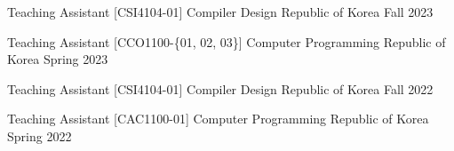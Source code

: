 

\begin{cventries}

  \cventry
    {Teaching Assistant} %
    {[CSI4104-01] Compiler Design} %
    {Republic of Korea} %
    {Fall 2023} %
    {}

  \cventry
    {Teaching Assistant} %
    {[CCO1100-\{01, 02, 03\}] Computer Programming} %
    {Republic of Korea} %
    {Spring 2023} %
    {}

  \cventry
    {Teaching Assistant} %
    {[CSI4104-01] Compiler Design} %
    {Republic of Korea} %
    {Fall 2022} %
    {}

  \cventry
    {Teaching Assistant} %
    {[CAC1100-01] Computer Programming} %
    {Republic of Korea} %
    {Spring 2022} %
    {}

\end{cventries}
